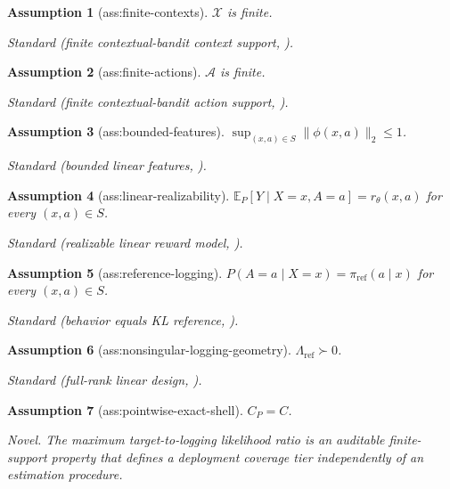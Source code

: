 \documentclass{article}
\newtheorem{assumption}{Assumption}
\begin{document}
\begin{assumption}[ass:finite-contexts]\label{ass:finite-contexts}
\(\mathcal X\) is finite.
\par\smallskip\noindent\emph{Standard} (finite contextual-bandit context support, \cite{ZhaoJiZhaoZhangGu2026SharpFDivergence}).
\end{assumption}

\begin{assumption}[ass:finite-actions]\label{ass:finite-actions}
\(\mathcal A\) is finite.
\par\smallskip\noindent\emph{Standard} (finite contextual-bandit action support, \cite{ZhaoJiZhaoZhangGu2026SharpFDivergence}).
\end{assumption}

\begin{assumption}[ass:bounded-features]\label{ass:bounded-features}
\(\sup_{(x,a)\in S}\|\phi(x,a)\|_2\le1\).
\par\smallskip\noindent\emph{Standard} (bounded linear features, \cite{LiMaSrebro2022PUNC}).
\end{assumption}

\begin{assumption}[ass:linear-realizability]\label{ass:linear-realizability}
\(\mathbb E_P[Y\mid X=x,A=a]=r_\theta(x,a)\) for every \((x,a)\in S\).
\par\smallskip\noindent\emph{Standard} (realizable linear reward model, \cite{LiMaSrebro2022PUNC}).
\end{assumption}

\begin{assumption}[ass:reference-logging]\label{ass:reference-logging}
\(P(A=a\mid X=x)=\pi_{\mathrm{ref}}(a\mid x)\) for every \((x,a)\in S\).
\par\smallskip\noindent\emph{Standard} (behavior equals KL reference, \cite{ZhaoJiZhaoZhangGu2026SharpFDivergence}).
\end{assumption}

\begin{assumption}[ass:nonsingular-logging-geometry]\label{ass:nonsingular-logging-geometry}
\(\Lambda_{\mathrm{ref}}\succ0\).
\par\smallskip\noindent\emph{Standard} (full-rank linear design, \cite{LiMaSrebro2022PUNC}).
\end{assumption}

\begin{assumption}[ass:pointwise-exact-shell]\label{ass:pointwise-exact-shell}
\(C_P=C\).
\par\smallskip\noindent\emph{Novel.} The maximum target-to-logging likelihood ratio is an auditable finite-support property that defines a deployment coverage tier independently of an estimation procedure.
\end{assumption}
\end{document}
